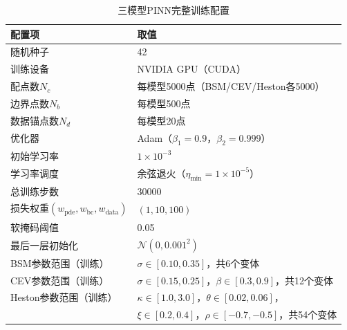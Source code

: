 \begin{table}[htbp]
  \centering
  \caption{三模型PINN完整训练配置}
  \label{tab:train_config}
  \begin{tabular}{ll}
    \hline
    配置项 & 取值 \\
    \hline
    随机种子 & 42 \\
    训练设备 & NVIDIA GPU（CUDA）\\
    配点数$N_c$ & 每模型5000点（BSM/CEV/Heston各5000）\\
    边界点数$N_b$ & 每模型500点 \\
    数据锚点数$N_d$ & 每模型20点 \\
    优化器 & Adam（$\beta_1=0.9$，$\beta_2=0.999$）\\
    初始学习率 & $1\times 10^{-3}$ \\
    学习率调度 & 余弦退火（$\eta_\text{min}=1\times10^{-5}$）\\
    总训练步数 & 30000 \\
    损失权重$(w_\text{pde},w_\text{bc},w_\text{data})$ & $(1, 10, 100)$ \\
    软掩码阈值 & 0.05 \\
    最后一层初始化 & $\mathcal{N}(0, 0.001^2)$ \\
    BSM参数范围（训练） & $\sigma\in[0.10,0.35]$，共6个变体 \\
    CEV参数范围（训练） & $\sigma\in[0.15,0.25]$，$\beta\in[0.3,0.9]$，共12个变体 \\
    Heston参数范围（训练） & $\kappa\in[1.0,3.0]$，$\theta\in[0.02,0.06]$，\\
                           & $\xi\in[0.2,0.4]$，$\rho\in[-0.7,-0.5]$，共54个变体 \\
    \hline
  \end{tabular}
\end{table}
